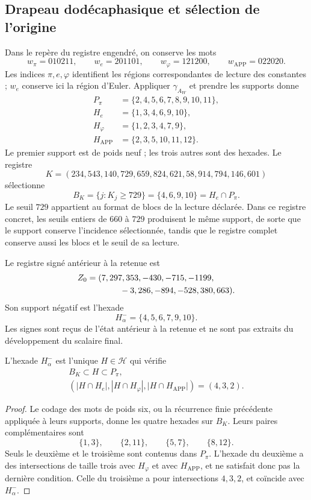 \subsection{Drapeau dodécaphasique et sélection de l'origine}
\label{subsec:lf-flag}

Dans le repère du registre engendré, on conserve les mots
\[
 w_\pi=010211,\qquad
 w_e=201101,\qquad
 w_\varphi=121200,\qquad
 w_{\mathrm{APP}}=022020.
\]
Les indices \(\pi,e,\varphi\) identifient les régions correspondantes de lecture des constantes ; \(w_e\) conserve ici la région d'Euler. Appliquer \(\gamma_{A_W}\) et prendre les supports donne
\[
\begin{aligned}
 P_\pi&=\{2,4,5,6,7,8,9,10,11\},\\
 H_e&=\{1,3,4,6,9,10\},\\
 H_\varphi&=\{1,2,3,4,7,9\},\\
 H_{\mathrm{APP}}&=\{2,3,5,10,11,12\}.
\end{aligned}
\]
Le premier support est de poids neuf ; les trois autres sont des
hexades. Le registre
\[
 K=(234,543,140,729,659,824,621,58,914,794,146,601)
\]
sélectionne
\[
 B_K=\{j:K_j\geq729\}=\{4,6,9,10\}=H_e\cap P_\pi.
\]
Le seuil \(729\) appartient au format de blocs de la
lecture déclarée. Dans ce registre concret, les seuils
entiers de \(660\) à \(729\) produisent le même support, de
sorte que le support conserve l’incidence sélectionnée,
tandis que le registre complet conserve aussi les blocs
et le seuil de sa lecture.

Le registre signé antérieur à la retenue est
\[
\begin{split}
 Z_0={}&(7,297,353,-430,-715,-1199,\\
       &\hspace{9mm}-3,286,-894,-528,380,663).
\end{split}
\]
Son support négatif est l’hexade
\[
 H_\alpha^-=\{4,5,6,7,9,10\}.
\]
Les signes sont reçus de l'état antérieur à la retenue et ne sont pas extraits du développement du scalaire final.

\begin{proposition}
\label{prop:lf-flag}
L’hexade \(H_\alpha^-\) est l’unique \(H\in\mathcal H\) qui vérifie
\[
\begin{gathered}
 B_K\subset H\subset P_\pi,\\
 (|H\cap H_e|,|H\cap H_\varphi|,
                   |H\cap H_{\mathrm{APP}}|)=(4,3,2).
\end{gathered}
\]
\end{proposition}
\begin{proof}
Le codage des mots de poids six, ou la récurrence finie précédente appliquée à leurs supports, donne les quatre hexades sur \(B_K\). Leurs paires complémentaires sont
\[
 \{1,3\},\qquad\{2,11\},\qquad\{5,7\},\qquad\{8,12\}.
\]
Seuls le deuxième et le troisième sont contenus dans \(P_\pi\).
L’hexade du deuxième a des intersections de taille trois
avec \(H_\varphi\) et avec \(H_{\mathrm{APP}}\), et ne satisfait donc pas
la dernière condition. Celle du troisième a pour
intersections \(4,3,2\), et coïncide avec \(H_\alpha^-\).
\end{proof}

